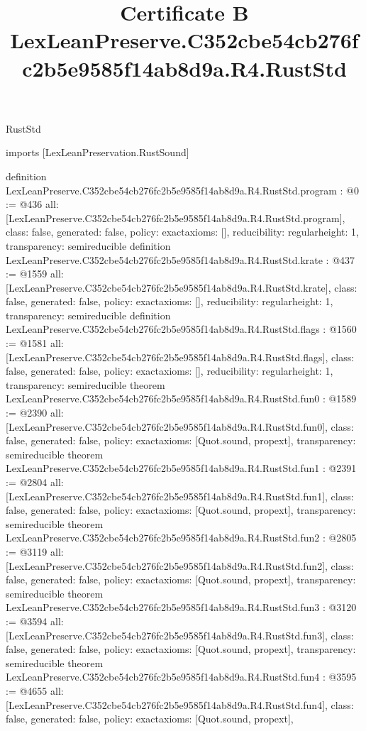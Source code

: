 \begin{lexlean}{RustStd}
\title{Certificate B LexLeanPreserve.C352cbe54cb276fc2b5e9585f14ab8d9a.R4.RustStd}
\begin{coremodule}
imports [LexLeanPreservation.RustSound]

definition LexLeanPreserve.C352cbe54cb276fc2b5e9585f14ab8d9a.R4.RustStd.program : @0 := @436 {
  all: [LexLeanPreserve.C352cbe54cb276fc2b5e9585f14ab8d9a.R4.RustStd.program],
  class: false,
  generated: false,
  policy: exact{axioms: []},
  reducibility: regular{height: 1},
  transparency: semireducible
}
definition LexLeanPreserve.C352cbe54cb276fc2b5e9585f14ab8d9a.R4.RustStd.krate : @437 := @1559 {
  all: [LexLeanPreserve.C352cbe54cb276fc2b5e9585f14ab8d9a.R4.RustStd.krate],
  class: false,
  generated: false,
  policy: exact{axioms: []},
  reducibility: regular{height: 1},
  transparency: semireducible
}
definition LexLeanPreserve.C352cbe54cb276fc2b5e9585f14ab8d9a.R4.RustStd.flags : @1560 := @1581 {
  all: [LexLeanPreserve.C352cbe54cb276fc2b5e9585f14ab8d9a.R4.RustStd.flags],
  class: false,
  generated: false,
  policy: exact{axioms: []},
  reducibility: regular{height: 1},
  transparency: semireducible
}
theorem LexLeanPreserve.C352cbe54cb276fc2b5e9585f14ab8d9a.R4.RustStd.fun0 : @1589 := @2390 {
  all: [LexLeanPreserve.C352cbe54cb276fc2b5e9585f14ab8d9a.R4.RustStd.fun0],
  class: false,
  generated: false,
  policy: exact{axioms: [Quot.sound, propext]},
  transparency: semireducible
}
theorem LexLeanPreserve.C352cbe54cb276fc2b5e9585f14ab8d9a.R4.RustStd.fun1 : @2391 := @2804 {
  all: [LexLeanPreserve.C352cbe54cb276fc2b5e9585f14ab8d9a.R4.RustStd.fun1],
  class: false,
  generated: false,
  policy: exact{axioms: [Quot.sound, propext]},
  transparency: semireducible
}
theorem LexLeanPreserve.C352cbe54cb276fc2b5e9585f14ab8d9a.R4.RustStd.fun2 : @2805 := @3119 {
  all: [LexLeanPreserve.C352cbe54cb276fc2b5e9585f14ab8d9a.R4.RustStd.fun2],
  class: false,
  generated: false,
  policy: exact{axioms: [Quot.sound, propext]},
  transparency: semireducible
}
theorem LexLeanPreserve.C352cbe54cb276fc2b5e9585f14ab8d9a.R4.RustStd.fun3 : @3120 := @3594 {
  all: [LexLeanPreserve.C352cbe54cb276fc2b5e9585f14ab8d9a.R4.RustStd.fun3],
  class: false,
  generated: false,
  policy: exact{axioms: [Quot.sound, propext]},
  transparency: semireducible
}
theorem LexLeanPreserve.C352cbe54cb276fc2b5e9585f14ab8d9a.R4.RustStd.fun4 : @3595 := @4655 {
  all: [LexLeanPreserve.C352cbe54cb276fc2b5e9585f14ab8d9a.R4.RustStd.fun4],
  class: false,
  generated: false,
  policy: exact{axioms: [Quot.sound, propext]},
}
\end{coremodule}
\end{lexlean}
